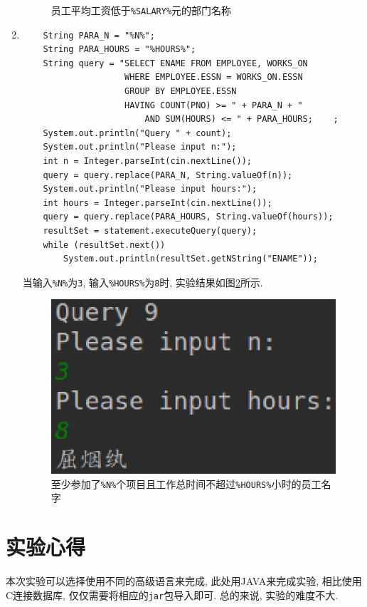 \documentclass{ML}
\begin{document}
\begin{enumerate}
\begin{figure}[H]
    \caption{员工平均工资低于\texttt{\%SALARY\%}元的部门名称}\label{fig:3.8}
    \end{figure}
    \item \begin{verbatim}
    String PARA_N = "%N%";
    String PARA_HOURS = "%HOURS%";
    String query = "SELECT ENAME FROM EMPLOYEE, WORKS_ON 
                    WHERE EMPLOYEE.ESSN = WORKS_ON.ESSN 
                    GROUP BY EMPLOYEE.ESSN 
                    HAVING COUNT(PNO) >= " + PARA_N + " 
                        AND SUM(HOURS) <= " + PARA_HOURS;    ;
    System.out.println("Query " + count);
    System.out.println("Please input n:");
    int n = Integer.parseInt(cin.nextLine());
    query = query.replace(PARA_N, String.valueOf(n));
    System.out.println("Please input hours:");
    int hours = Integer.parseInt(cin.nextLine());
    query = query.replace(PARA_HOURS, String.valueOf(hours));
    resultSet = statement.executeQuery(query);
    while (resultSet.next())
        System.out.println(resultSet.getNString("ENAME"));
    \end{verbatim}
    当输入\texttt{\%N\%}为\texttt{3}, 输入\texttt{\%HOURS\%}为\texttt{8}时, 实验结果如图\ref{fig:3.9}所示.
    \begin{figure}[H]
        \centering
        \includegraphics[scale = 0.5, bb=0 0 236 138]{media/3.9.eps}
        \caption{至少参加了\texttt{\%N\%}个项目且工作总时间不超过\texttt{\%HOURS\%}小时的员工名字}\label{fig:3.9}
    \end{figure}
\end{enumerate}
\section{实验心得}
本次实验可以选择使用不同的高级语言来完成, 此处用JAVA来完成实验, 相比使用C连接数据库, 仅仅需要将相应的\texttt{jar}包导入即可.
总的来说, 实验的难度不大.

\end{document}
